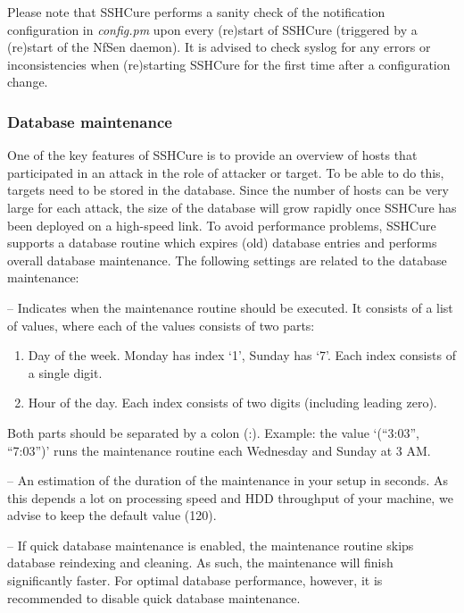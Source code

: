 Please note that SSHCure performs a sanity check of the notification configuration in \textit{config.pm} upon every (re)start of SSHCure (triggered by a (re)start of the NfSen daemon). It is advised to check syslog for any errors or inconsistencies when (re)starting SSHCure for the first time after a configuration change.

\subsubsection{Database maintenance}

One of the key features of SSHCure is to provide an overview of hosts that participated in an attack in the role of attacker or target. To be able to do this, targets need to be stored in the database. Since the number of hosts can be very large for each attack, the size of the database will grow rapidly once SSHCure has been deployed on a high-speed link. To avoid performance problems, SSHCure supports a database routine which expires (old) database entries and performs overall database maintenance. The following settings are related to the database maintenance:

\begin{description}[font=\normalfont]
	\item [MAINTENANCE\_TRIGGER] -- Indicates when the maintenance routine should be executed. It consists of a list of values, where each of the values consists of two parts:
	
	\begin{enumerate}
		\item Day of the week. Monday has index `1', Sunday has `7'. Each index consists of a single digit.
		
		\item Hour of the day. Each index consists of two digits (including leading zero).
	\end{enumerate}
	
	Both parts should be separated by a colon (:). Example: the value `(``3:03'', ``7:03'')' runs the maintenance routine each Wednesday and Sunday at 3 AM.
	
	\item [MAINTENANCE\_TIME\_NEEDED] -- An estimation of the duration of the maintenance in your setup in  seconds. As this depends a lot on processing speed and HDD throughput of your machine, we advise to keep the default value (120).
	
	\item [QUICK] -- If quick database maintenance is enabled, the maintenance routine skips database reindexing and cleaning. As such, the maintenance will finish significantly faster. For optimal database performance, however, it is recommended to disable quick database maintenance.
\end{description}

